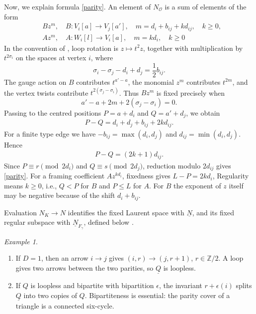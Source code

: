 \documentclass[11pt,reqno]{amsart}
\theoremstyle{definition}
\theoremstyle{remark}
\newtheorem{Example}[Theorem]{Example}
\def\bbZ{\mathbb Z}
\def\dN{\underline N}
\def\dQ{\underline Q}
\providecommand{\calO}{\mathcal O}
\begin{document}
Now, we explain formula \eqref{parity}. 
An element of $N_\calO$ is a sum of elements of the form
\begin{align*}
 &Bz^m,\quad B:V_i[a]\longrightarrow V_j[a'],\quad
 m=d_i+b_{ij}+kd_{ij},\quad k\geqslant0,\\
 &Az^m,\quad  A:W_i[l]\to V_i[a],\quad m=kd_i,\quad k\geqslant 0
 \end{align*}
In the convention of \cite{VV25}, \cite{VVsh}
loop rotation is $z\mapsto t^2z$, together with multiplication by
$t^{2\sigma_i}$ on the spaces at vertex $i$, where
\[
 \sigma_i-\sigma_j-d_i+d_j=\frac12 b_{ij}.
\]
The gauge action on $B$ contributes $t^{a'-a}$, the monomial $z^m$
contributes $t^{2m}$, and the vertex twists contribute
$t^{2(\sigma_j-\sigma_i)}$.
Thus $Bz^m$ is fixed precisely when
\[
 a'-a+2m+2(\sigma_j-\sigma_i)=0.
\]
Passing to the centred positions $P=a+d_i$ and $Q=a'+d_j$, we obtain
\[
 \begin{aligned}
 P-Q=d_i+d_j+b_{ij}+2kd_{ij}.
 \end{aligned}
\]
For a finite type edge we have
$-b_{ij}=\max(d_i,d_j)$ and $d_{ij}=\min(d_i,d_j)$. Hence
\begin{align}\label{CP}P-Q=(2k+1)d_{ij}.
\end{align}
Since $P\equiv r\pmod{2d_i}$ and $Q\equiv s\pmod{2d_j}$, reduction
modulo $2d_{ij}$ gives  \eqref{parity}.
For a framing coefficient
$Az^{kd_i}$, fixedness gives
$L-P=2kd_i$,
Regularity means $k\geqslant0$, i.e.,  $Q<P$ for $B$ and $P\leqslant L$ for $A$.
For $B$ the exponent of $z$ itself may be negative because of
the shift $d_i+b_{ij}$. 

Evaluation $N_K\to N$ identifies the fixed Laurent space with $\dN$, and its
fixed regular subspace with $\dN_{F_\gamma}$, defined below
\cite[(3.1.60), (3.1.66)-(3.1.70)]{VV25}.

\begin{Example}\hfill
\begin{enumerate}[label=$\mathrm{(\alph*)}$,leftmargin=8mm]
\item
If $D=1$, then an arrow $i\to j$ gives
$(i,r)\to(j,r+1)$, $r\in\bbZ/2$. A loop gives two arrows between
the two parities, so $\dQ$ is loopless. 
\item
If $Q$ is loopless and
bipartite with bipartition $\epsilon$, the invariant $r+\epsilon(i)$
splits $\dQ$ into two copies of $Q$. Bipartiteness is essential:
the parity cover of a triangle is a connected six-cycle.
\end{enumerate}
\end{Example}
\end{document}
